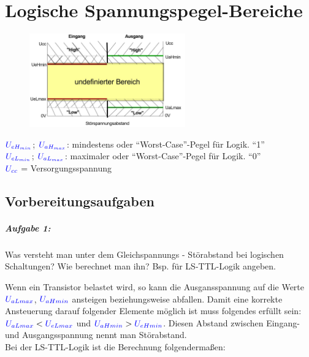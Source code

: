 \documentclass[11pt,a4paper,titlepage]{scrreprt}
\begin{document}
  \chapter{Logische Spannungspegel-Bereiche}

    \begin{figure}[!htbp]
      \begin{center}
        \includegraphics[width=0.6\textwidth]{./1_1_Z1.jpg}
      \end{center}
    \end{figure}

    $\textcolor{blue}{U_{eH_{min}}}$; $\textcolor{blue}{U_{aH_{max}}}$: mindestens oder "`Worst-Case"'-Pegel für Logik. "`1"'\\
    $\textcolor{blue}{U_{eL_{min}}}$; $\textcolor{blue}{U_{aL_{max}}}$: maximaler oder "`Worst-Case"'-Pegel für Logik. "`0"'\\
    $\textcolor{blue}{U_{cc}}$ = Versorgungsspannung\\

    \section{Vorbereitungsaufgaben}

      \paragraph{Aufgabe 1:} Was versteht man unter dem Gleichspannungs - Störabstand bei logischen Schaltungen? Wie berechnet man ihn? Bsp. für LS-TTL-Logik angeben.

        Wenn ein Transistor belastet wird, so kann die Ausgansspannung auf die Werte $\textcolor{blue}{U_{aLmax}}$, $\textcolor{blue}{U_{aHmin}}$ ansteigen beziehungsweise abfallen. Damit eine korrekte Ansteuerung darauf folgender Elemente möglich ist muss folgendes erfüllt sein:  $\textcolor{blue}{U_{aLmax}} < \textcolor{blue}{U_{eLmax}}$ und $\textcolor{blue}{U_{aHmin}} > \textcolor{blue}{U_{eHmin}}$. Diesen Abstand zwischen Eingang- und Ausgangsspannung nennt man Störabstand.\\
        Bei der LS-TTL-Logik ist die Berechnung folgendermaßen:
\end{document}
